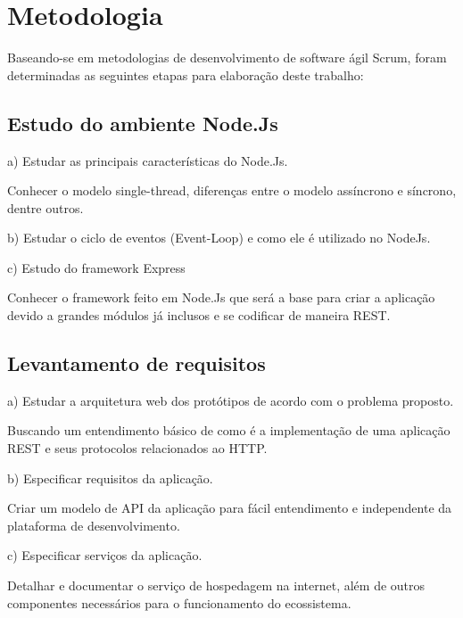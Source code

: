 \chapter{Metodologia}
\label{metodologia}

\vspace{-1.9cm}

  Baseando-se em metodologias de desenvolvimento de software ágil Scrum, foram determinadas 
  as seguintes etapas para elaboração deste trabalho:


\section{Estudo do ambiente Node.Js}
  
  \begin{compactitem}
    \item[a)] Estudar as principais características do Node.Js.
    
    Conhecer o modelo single-thread, diferenças entre o modelo assíncrono e síncrono, dentre outros.
    
    \item[b)] Estudar o ciclo de eventos (Event-Loop) e como ele é utilizado no NodeJs.
    
    \item[c)] Estudo do framework Express
    
    Conhecer o framework feito em Node.Js que será a base para criar a 
    aplicação devido a grandes módulos já inclusos e se codificar de maneira \ac{REST}.

  \end{compactitem}
  
\section{Levantamento de requisitos}

  \begin{compactitem}
    \item[a)] Estudar a arquitetura web dos protótipos de acordo com o problema proposto.
    
    Buscando um entendimento básico de como é a implementação de uma aplicação 
    \ac{REST} e seus protocolos relacionados ao HTTP.
    
    \item[b)] Especificar requisitos da aplicação.
    
    Criar um modelo de API da aplicação para fácil entendimento e
    independente da plataforma de desenvolvimento.
    
    \item[c)] Especificar serviços da aplicação.
    
    Detalhar e documentar o serviço de hospedagem na internet, além de outros componentes 
    necessários para o funcionamento do ecossistema.
      
  \end{compactitem}

